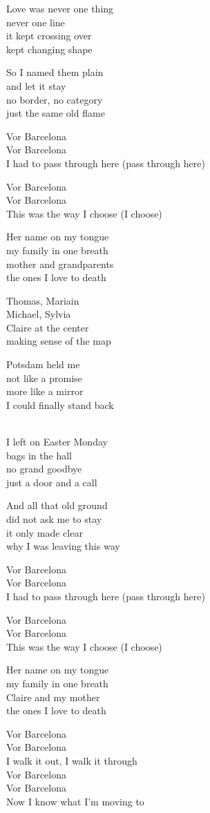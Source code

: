 \begin{lyrics}
Love was never one thing\\
never one line\\
it kept crossing over\\
kept changing shape

So I named them plain\\
and let it stay\\
no border, no category\\
just the same old flame

Vor Barcelona\\
Vor Barcelona\\
I had to pass through here (pass through here)

Vor Barcelona\\
Vor Barcelona\\
This was the way I choose (I choose)

Her name on my tongue\\
my family in one breath\\
mother and grandparents\\
the ones I love to death

Thomas, Mariain\\
Michael, Sylvia\\
Claire at the center\\
making sense of the map

Potsdam held me\\
not like a promise\\
more like a mirror\\
I could finally stand back

\\
I left on Easter Monday\\
bags in the hall\\
no grand goodbye\\
just a door and a call

And all that old ground\\
did not ask me to stay\\
it only made clear\\
why I was leaving this way

Vor Barcelona\\
Vor Barcelona\\
I had to pass through here (pass through here)

Vor Barcelona\\
Vor Barcelona\\
This was the way I choose (I choose)

Her name on my tongue\\
my family in one breath\\
Claire and my mother\\
the ones I love to death

Vor Barcelona\\
Vor Barcelona\\
I walk it out, I walk it through\\
Vor Barcelona\\
Vor Barcelona\\
Now I know what I’m moving to
\end{lyrics}

